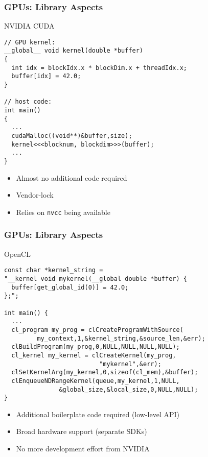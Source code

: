 


\begin{frame}[fragile]
\frametitle{GPUs: Library Aspects}
 \begin{block}{NVIDIA CUDA}
  \begin{lstlisting}
// GPU kernel:
__global__ void kernel(double *buffer)
{
  int idx = blockIdx.x * blockDim.x + threadIdx.x;
  buffer[idx] = 42.0;
}

// host code:
int main()
{ 
  ...
  cudaMalloc((void**)&buffer,size);
  kernel<<<blocknum, blockdim>>>(buffer);
  ...
}
  \end{lstlisting} 

  \begin{itemize}
   \item Almost no additional code required
   \item Vendor-lock
   \item Relies on \lstinline|nvcc| being available
  \end{itemize}
 \end{block}

\end{frame}



\begin{frame}[fragile]
\frametitle{GPUs: Library Aspects}
 \begin{block}{OpenCL}
  \begin{lstlisting}
const char *kernel_string =
"__kernel void mykernel(__global double *buffer) {
  buffer[get_global_id(0)] = 42.0;
};";   

int main() {
  ...
  cl_program my_prog = clCreateProgramWithSource(
         my_context,1,&kernel_string,&source_len,&err);
  clBuildProgram(my_prog,0,NULL,NULL,NULL,NULL);
  cl_kernel my_kernel = clCreateKernel(my_prog,
                          "mykernel",&err);
  clSetKernelArg(my_kernel,0,sizeof(cl_mem),&buffer);
  clEnqueueNDRangeKernel(queue,my_kernel,1,NULL,
               &global_size,&local_size,0,NULL,NULL);
} 
  \end{lstlisting} 

  \begin{itemize}
   \item Additional boilerplate code required (low-level API)
   \item Broad hardware support (separate SDKs)
   \item No more development effort from NVIDIA
  \end{itemize}
 \end{block}

\end{frame}



